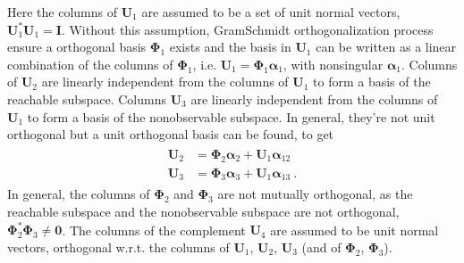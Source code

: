 \documentclass[letterpaper,10pt,english]{jupyterBook}
\begin{document}
\sphinxAtStartPar
{} Here the columns of \(\mathbf{U}_1\) are assumed to be a set of unit normal vectors, \(\mathbf{U}_1^* \mathbf{U}_1 = \mathbf{I}\). Without this assumption, Gram\sphinxhyphen{}Schmidt orthogonalization process ensure a orthogonal basis \(\boldsymbol\Phi_1\) exists and the basis in \(\mathbf{U}_1\) can be written as a linear combination of the columns of \(\boldsymbol\Phi_1\), i.e. \(\mathbf{U}_1 = \boldsymbol\Phi_1 \boldsymbol\alpha_1\), with non\sphinxhyphen{}singular \(\boldsymbol\alpha_1\). Columns of \(\mathbf{U}_2\) are linearly independent from the columns of \(\mathbf{U}_1\) to form a basis of the reachable sub\sphinxhyphen{}space. Columns \(\mathbf{U}_3\) are linearly independent from the columns of \(\mathbf{U}_1\) to form a basis of the non\sphinxhyphen{}observable sub\sphinxhyphen{}space. In general, they’re not unit orthogonal but a unit orthogonal basis can be found, to get
\begin{equation*}
\begin{split}\begin{aligned}
  \mathbf{U}_2 & = \boldsymbol\Phi_2 \boldsymbol\alpha_2 + \mathbf{U}_1 \boldsymbol\alpha_{12} \\
  \mathbf{U}_3 & = \boldsymbol\Phi_3 \boldsymbol\alpha_3 + \mathbf{U}_1 \boldsymbol\alpha_{13} \ .
\end{aligned}\end{split}
\end{equation*}
\sphinxAtStartPar
In general, the columns of \(\boldsymbol\Phi_2\) and \(\boldsymbol\Phi_3\) are not mutually orthogonal, as the reachable sub\sphinxhyphen{}space and the non\sphinxhyphen{}observable sub\sphinxhyphen{}space are not orthogonal, \(\boldsymbol\Phi_2^* \boldsymbol\Phi_3 \ne \mathbf{0}\). The columns of the complement \(\mathbf{U}_4\) are assumed to be unit normal vectors, orthogonal w.r.t. the columns of \(\mathbf{U}_1\), \(\mathbf{U}_2\), \(\mathbf{U}_3\) (and of \(\boldsymbol\Phi_2\), \(\boldsymbol\Phi_3\)).
\end{document}
